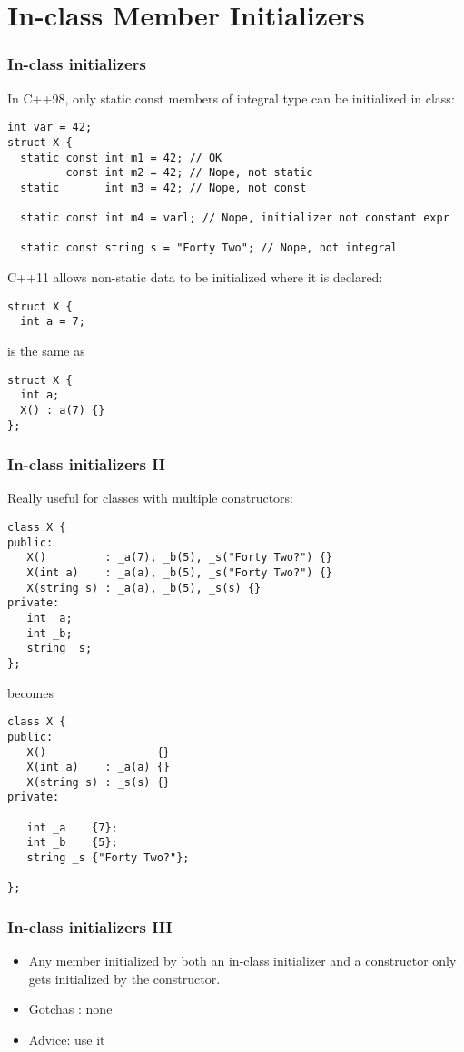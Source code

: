 
\section{In-class Member Initializers}
\begin{frame}[fragile]

\frametitle{In-class initializers}
In C++98, only static const members of integral type can be
initialized in class:
{\scriptsize
\begin{verbatim}
int var = 42;
struct X {
  static const int m1 = 42; // OK
         const int m2 = 42; // Nope, not static
  static       int m3 = 42; // Nope, not const

  static const int m4 = varl; // Nope, initializer not constant expr

  static const string s = "Forty Two"; // Nope, not integral
\end{verbatim}
}
\pause{}
C++11 allows non-static data to be initialized where it is declared:

{\scriptsize
\begin{verbatim}
struct X {
  int a = 7;
\end{verbatim}
}

is the same as

{\scriptsize
\begin{verbatim}
struct X {
  int a;
  X() : a(7) {}
};
\end{verbatim}
}

\end{frame}


\begin{frame}[fragile]
\frametitle{In-class initializers II}
Really useful for classes with multiple constructors:

{\scriptsize
\begin{verbatim}
class X {
public:
   X()         : _a(7), _b(5), _s("Forty Two?") {}
   X(int a)    : _a(a), _b(5), _s("Forty Two?") {}
   X(string s) : _a(a), _b(5), _s(s) {}
private:
   int _a;
   int _b;
   string _s;
};
\end{verbatim}
}

becomes

{\scriptsize
\begin{verbatim}
class X {
public:
   X()                 {}
   X(int a)    : _a(a) {}
   X(string s) : _s(s) {}
private:

   int _a    {7};
   int _b    {5};
   string _s {"Forty Two?"};

};
\end{verbatim}
}
\end{frame}

\begin{frame}[fragile]
\frametitle{In-class initializers III}
\begin{itemize}
\item Any member initialized by both an in-class initializer and a
constructor only gets initialized by the constructor.
\item Gotchas : none
\item Advice: use it
\end{itemize}


\end{frame}
